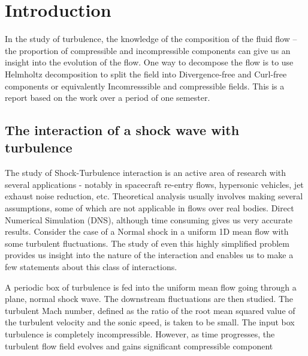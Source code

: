 \documentclass[12pt, a4paper]{report}
\begin{document}
\pagestyle{plain}
\def\title{Helmholtz decomposition of Flow Fields}
\def\what{SLP Report}
\def\who{Harish Murali (140010046)}
\def\guide{Prof. Krishnendhu Sinha}

\titlpage

\newpage
{}

\tableofcontents
\listoffigures


\chapter{Introduction}
In the study of turbulence, the knowledge of the composition of the fluid flow -- the proportion of compressible and incompressible components can give us an insight into the evolution of the flow. One way to decompose the flow is to use Helmholtz decomposition to split the field into Divergence-free and Curl-free components or equivalently Incomresssible and compressible fields. This is a report based on the work over a period of one semester. %
\section{The interaction of a shock wave with turbulence}

The study of Shock-Turbulence interaction is an active area of research with several applications - notably in spacecraft re-entry flows, hypersonic vehicles, jet exhaust noise reduction, etc. Theoretical analysis usually involves making several assumptions, some of which are not applicable in flows over real bodies. Direct Numerical Simulation (DNS), although time consuming gives us very accurate results. Consider the case of a Normal shock in a uniform 1D mean flow with some turbulent fluctuations. The study of even this highly simplified problem provides us insight into the nature of the interaction and enables us to make a few statements about this class of interactions.

A periodic box of turbulence is fed into the uniform mean flow going through a plane, normal shock wave. The downstream fluctuations are then studied. The turbulent Mach number, defined as the ratio of the root mean squared value of the turbulent velocity and the sonic speed, is taken to be small. The input box turbulence is completely incompressible. However, as time progresses, the turbulent flow field evolves and gains significant compressible component
\end{document}
